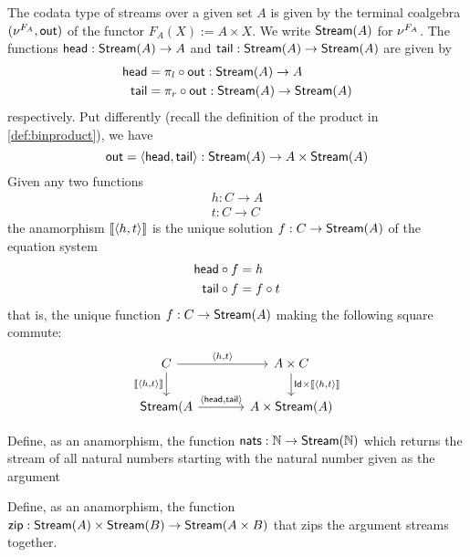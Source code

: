 \begin{exa}[Streams]
  The codata type of streams over a given set $A$ is given by the terminal coalgebra $(\Terminalcoalg{F_A}, \Out)$ of the functor $F_A (X) := A \times X$.
  We write $\Stream(A)$ for $\Terminalcoalg{F_A}$.
  The functions $\head : \Stream(A) \to A$ and $\tail : \Stream(A) \to \Stream(A)$
  are given by
  \begin{align*}
    \head &= \co{\Out}{\projl} : \Stream(A) \to A
    \\
    \tail &= \co{\Out}{\projr} : \Stream(A) \to \Stream(A)
  \end{align*}
  respectively. Put differently (recall the definition of the product in \cref{def:binproduct}), we have
  \[
    \Out = \langle \head, \tail \rangle : \Stream(A) \to A \times \Stream(A)
  \] 
  Given any two functions
  \begin{align*}
    h : C \to  A
    \\
    t : C \to C
  \end{align*}
  the anamorphism $\anam{\langle h, t \rangle }$ is the unique solution
  $f : C \to  \Stream(A)$
  of the equation system
  \begin{align*}
    \co{f} \head &= h
    \\
    \co f \tail &=  \co t f
  \end{align*}
  that is, the unique function $f : C \to \Stream(A)$ making the following square commute:
  \[
    \begin{tikzcd}[column sep = large]
      C
      \ar[r, "{\langle h, t \rangle}"]
      \ar[d, "\anam{\langle h, t \rangle}"']
      &
      A \times C
      \ar[d, "\Id \times \anam{\langle h, t \rangle}"]
      \\
      \Stream(A
      \ar[r, "{\langle \head, \tail \rangle}"]
      &
      A \times \Stream(A)
    \end{tikzcd}
  \]
  
\end{exa}

\begin{exer}\label{exer:stream-of-nats}
  Define, as an anamorphism, the function $\nats : \NN \to \Stream(\NN)$ which returns the stream of all natural
  numbers starting with the natural number given as the argument
\end{exer}


\begin{exer}\label{exer:zip}
  Define, as an anamorphism, the function $\zip : \Stream(A) \times \Stream(B) \to \Stream(A \times B)$ that zips the argument streams together.
\end{exer}

